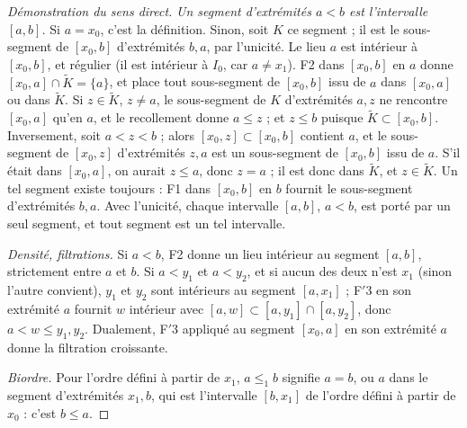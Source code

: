 \begin{proof}[Démonstration du sens direct]
\emph{Un segment d'extrémités $a < b$ est l'intervalle $[a,b]$.} Si $a = x_0$, c'est la définition. Sinon, soit $K$ ce segment ; il est le sous-segment de $[x_0,b]$ d'extrémités $b, a$, par l'unicité. Le lieu $a$ est intérieur à $[x_0,b]$, et régulier (il est intérieur à $I_0$, car $a \neq x_1$). F2 dans $[x_0,b]$ en $a$ donne $[x_0,a] \cap \widetilde K = \{a\}$, et place tout sous-segment de $[x_0,b]$ issu de $a$ dans $[x_0,a]$ ou dans $\widetilde K$. Si $z \in \widetilde K$, $z \neq a$, le sous-segment de $K$ d'extrémités $a, z$ ne rencontre $[x_0, a]$ qu'en $a$, et le recollement donne $a \leq z$ ; et $z \leq b$ puisque $\widetilde K \subset [x_0,b]$. Inversement, soit $a < z < b$ ; alors $[x_0,z] \subset [x_0,b]$ contient $a$, et le sous-segment de $[x_0,z]$ d'extrémités $z, a$ est un sous-segment de $[x_0,b]$ issu de $a$. S'il était dans $[x_0,a]$, on aurait $z \leq a$, donc $z = a$ ; il est donc dans $\widetilde K$, et $z \in \widetilde K$. Un tel segment existe toujours : F1 dans $[x_0,b]$ en $b$ fournit le sous-segment d'extrémités $b, a$. Avec l'unicité, chaque intervalle $[a,b]$, $a<b$, est porté par un seul segment, et tout segment est un tel intervalle.

\emph{Densité, filtrations.} Si $a < b$, F2 donne un lieu intérieur au segment $[a,b]$, strictement entre $a$ et $b$. Si $a < y_1$ et $a < y_2$, et si aucun des deux n'est $x_1$ (sinon l'autre convient), $y_1$ et $y_2$ sont intérieurs au segment $[a,x_1]$ ; F$'$3 en son extrémité $a$ fournit $w$ intérieur avec $[a,w] \subset [a,y_1] \cap [a,y_2]$, donc $a < w \leq y_1, y_2$. Dualement, F$'$3 appliqué au segment $[x_0,a]$ en son extrémité $a$ donne la filtration croissante.

\emph{Biordre.} Pour l'ordre défini à partir de $x_1$, $a \leq_{1} b$ signifie $a = b$, ou $a$ dans le segment d'extrémités $x_1, b$, qui est l'intervalle $[b, x_1]$ de l'ordre défini à partir de $x_0$ : c'est $b \leq a$.
\end{proof}

